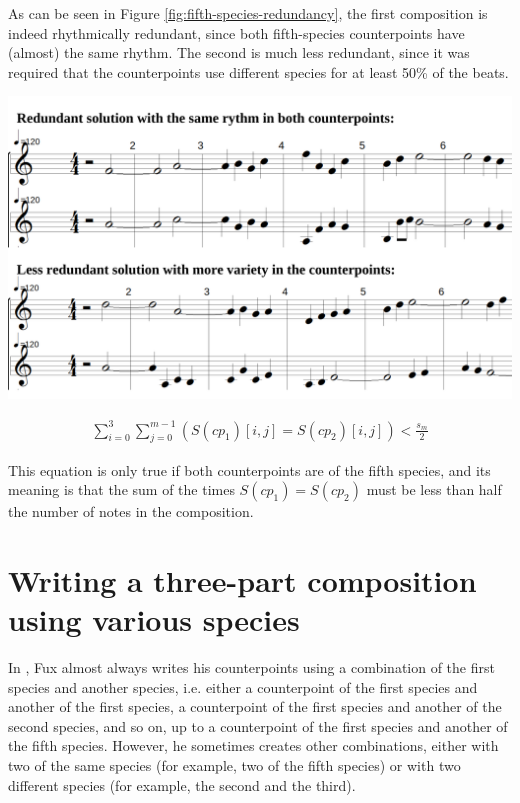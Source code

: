 \noindent
\begin{minipage}{0.37\textwidth}
    As can be seen in Figure \ref{fig:fifth-species-redundancy}, the first composition is indeed rhythmically redundant, since both fifth-species counterpoints have (almost) the same rhythm. The second is much less redundant, since it was required that the counterpoints use different species for at least 50\% of the beats.
    \end{minipage}
    \hfill
    \begin{minipage}{0.6\textwidth}
      \centering
      \includegraphics[width=\textwidth]{Images/fifth-species-redundancy.png}
      \label{fig:fifth-species-redundancy}
\end{minipage}
\vspace{.5cm}


\begin{equation}
\begin{aligned}
\sum_{i=0}^{3} \sum_{j=0}^{m-1} (S(cp_1)[i,j] = S(cp_2)[i,j]) < \frac{s_m}{2}
\end{aligned}
\end{equation}

This equation is only true if both counterpoints are of the fifth species, and its meaning is that the sum of the times $S(cp_1)=S(cp_2)$ must be less than half the number of notes in the composition.

\section{Writing a three-part composition using various species}
In \gap, Fux almost always writes his counterpoints using a combination of the first species and another species, i.e. either a counterpoint of the first species and another of the first species, a counterpoint of the first species and another of the second species, and so on, up to a counterpoint of the first species and another of the fifth species. However, he sometimes creates other combinations, either with two of the same species (for example, two of the fifth species) or with two different species (for example, the second and the third).

